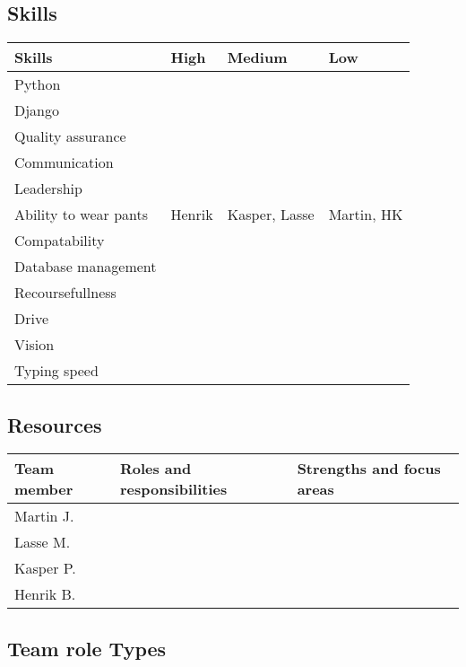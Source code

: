 \subsection{Skills}
\begin{table}
    \centering
    \begin{tabular}{l|l|l|l}
        \rowcolor{Gray}
        \textbf{Skills} & \textbf{High} & \textbf{Medium} & \textbf{Low}\\\hline
         Python & & &\\
         Django & & &\\
         Quality assurance & & &\\
         Communication & & &\\
         Leadership & & &\\
         Ability to wear pants & Henrik & Kasper, Lasse & Martin, HK\\
         Compatability & & &\\
         Database management & & &\\
         Recoursefullness & & &\\
         Drive & & &\\
         Vision & & &\\
         Typing speed & & &\\
    \end{tabular}
    \label{tab:Skillz}
\end{table}

\subsection{Resources}

\begin{table}
    \centering
    \begin{tabular}{l|l|l}
        \rowcolor{Gray}
        \textbf{Team member} & \textbf{Roles and responsibilities} & \textbf{Strengths and focus areas}\\\hline
        Martin J.            & &\\
        Lasse M.             & &\\
        Kasper P.            & &\\
        Henrik B.            & &
    \end{tabular}
    \label{tab:resources}
\end{table}

\subsection{Team role Types}

